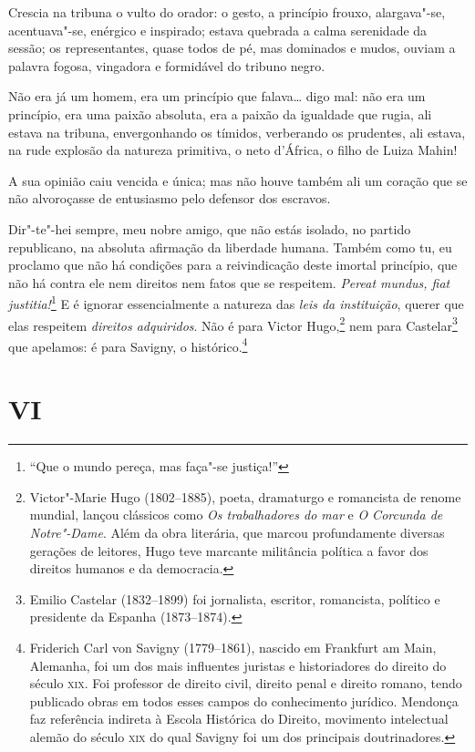 Crescia na tribuna o vulto do orador: o gesto, a princípio frouxo,
alargava"-se, acentuava"-se, enérgico e inspirado; estava quebrada a calma
serenidade da sessão; os representantes, quase todos de pé, mas
dominados e mudos, ouviam a palavra fogosa, vingadora e formidável do
tribuno negro.

Não era já um homem, era um princípio que falava\ldots{} digo mal: não era um
princípio, era uma paixão absoluta, era a paixão da igualdade que rugia,
ali estava na tribuna, envergonhando os tímidos, verberando os
prudentes, ali estava, na rude explosão da natureza primitiva, o neto
d'África, o filho de Luiza Mahin!

A sua opinião caiu vencida e única; mas não houve também ali um coração
que se não alvoroçasse de entusiasmo pelo defensor dos escravos.

Dir"-te"-hei sempre, meu nobre amigo, que não estás isolado, no partido
republicano, na absoluta afirmação da liberdade humana. Também como tu,
eu proclamo que não há condições para a reivindicação deste imortal
princípio, que não há contra ele nem direitos nem fatos que se
respeitem. \emph{Pereat mundus, fiat justitia!}\footnote{``Que o mundo
  pereça, mas faça"-se justiça!''} E é ignorar essencialmente a natureza
das \emph{leis da instituição}, querer que elas respeitem \emph{direitos
adquiridos}. Não é para Victor Hugo,\footnote{Victor"-Marie Hugo
  (1802--1885), poeta, dramaturgo e romancista de renome mundial, lançou
  clássicos como \emph{Os trabalhadores do mar} e \emph{O Corcunda de Notre"-Dame}.
  Além da obra literária, que marcou profundamente diversas gerações de
  leitores, Hugo teve marcante militância política a favor dos direitos
  humanos e da democracia.} nem para Castelar\footnote{Emilio
  Castelar (1832--1899) foi jornalista, escritor, romancista, político e
  presidente da Espanha (1873--1874).} que apelamos: é para Savigny, o
histórico.\footnote{Friderich Carl von Savigny (1779--1861), nascido em
  Frankfurt am Main, Alemanha, foi um dos mais influentes juristas e
  historiadores do direito do século \textsc{xix}. Foi professor de direito
  civil, direito penal e direito romano, tendo publicado obras em todos
  esses campos do conhecimento jurídico. Mendonça faz referência
  indireta à Escola Histórica do Direito, movimento intelectual alemão
  do século \textsc{xix} do qual Savigny foi um dos principais doutrinadores.}

\section*{VI}

